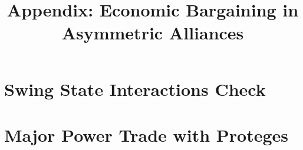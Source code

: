 \documentclass[12pt]{article}
\title{\textbf{Appendix: Economic Bargaining in Asymmetric Alliances}}
\date{}
\begin{document}
\maketitle 

\singlespace 

\tableofcontents

\bigskip


\section{Swing State Interactions Check} 



\section{Major Power Trade with Proteges}




\newpage
\singlespace
 
 
\end{document}
